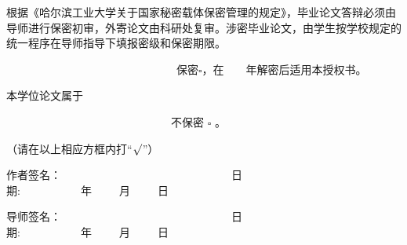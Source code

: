 \newpage



根据《哈尔滨工业大学关于国家秘密载体保密管理的规定》，毕业论文答辩必须由导师进行保密初审，外寄论文由科研处复审。涉密毕业论文，由学生按学校规定的统一程序在导师指导下填报密级和保密期限。

 \vspace{0.5cm}
~~~~~~~~~~~~~~~~~~~~~~~~~~~~~~~保密$\square$，在~~~~年解密后适用本授权书。

本学位论文属于

~~~~~~~~~~~~~~~~~~~~~~~~~~~~~~不保密 $\square$ 。

（请在以上相应方框内打“$\surd$”）
\vspace{1.0cm}

\begin{flushright}{
作者签名：~~~~~~~~~~~~~~~~~~~~~~~~~~~~~~~日期:~~~~~~~~~~~年~~~~~月~~~~~日}
\end{flushright} %
\begin{flushright}{
导师签名：~~~~~~~~~~~~~~~~~~~~~~~~~~~~~~~日期:~~~~~~~~~~~年~~~~~月~~~~~日}
\end{flushright}

\fi  %

 \iffalse %
%
%
%
%
%

